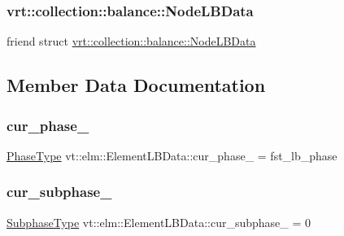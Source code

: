 \subsubsection{\texorpdfstring{vrt\+::collection\+::balance\+::\+Node\+L\+B\+Data}{vrt::collection::balance::NodeLBData}}
{\footnotesize\ttfamily friend struct \hyperlink{structvt_1_1vrt_1_1collection_1_1balance_1_1_node_l_b_data}{vrt\+::collection\+::balance\+::\+Node\+L\+B\+Data}\hspace{0.3cm}{\ttfamily [friend]}}



\subsection{Member Data Documentation}
\mbox{\label{structvt_1_1elm_1_1_element_l_b_data_af82526bf8ad50c6460ba51ffc1c92a43}} 
\subsubsection{\texorpdfstring{cur\+\_\+phase\+\_\+}{cur\_phase\_}}
{\footnotesize\ttfamily \hyperlink{namespacevt_a46ce6733d5cdbd735d561b7b4029f6d7}{Phase\+Type} vt\+::elm\+::\+Element\+L\+B\+Data\+::cur\+\_\+phase\+\_\+ = fst\+\_\+lb\+\_\+phase\hspace{0.3cm}{\ttfamily [protected]}}

\mbox{\label{structvt_1_1elm_1_1_element_l_b_data_a0489c5190d8a81bd5a4fba5d80d03d5d}} 
\subsubsection{\texorpdfstring{cur\+\_\+subphase\+\_\+}{cur\_subphase\_}}
{\footnotesize\ttfamily \hyperlink{namespacevt_ae78cbfdf1e57470e33eedb074f2beeba}{Subphase\+Type} vt\+::elm\+::\+Element\+L\+B\+Data\+::cur\+\_\+subphase\+\_\+ = 0\hspace{0.3cm}{\ttfamily [protected]}}

